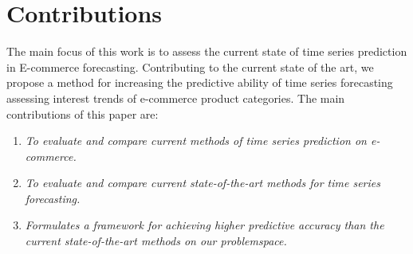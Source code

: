 \section{Contributions}
\label{sections:Introduction:Contributions}

The main focus of this work is to assess the current state of time series prediction in E-commerce forecasting.
Contributing to the current state of the art,
we propose a method for increasing the predictive ability of time series forecasting
assessing interest trends of e-commerce product categories.
The main contributions of this paper are:

\begin{enumerate}
    \item {\it To evaluate and compare current methods of time series prediction on e-commerce.}
    \item {\it To evaluate and compare current state-of-the-art methods for time series forecasting.}
    \item {\it Formulates a framework for achieving higher predictive accuracy than the current state-of-the-art methods on our problemspace.}
\end{enumerate}


\iffalse
The main description of the contributions will come in chapter~\ref{cont} after the results are presented. This section just provides a brief summary of the main contributions of the work. This section can also be left out, leaving all discussions in chapter~\ref{cont}.

The format of this section will generally follow the following format:
{\it
Donec non turpis nec neque egestas faucibus nec id neque. Etiam consectetur, odio vitae gravida tempus, diam velit sagittis turpis, a molestie ligula tellus at nunc. Nam convallis consequat vestibulum. Proin dolor neque, dapibus a pellentesque a, commodo a nibh.}

\begin{enumerate}
\item {\it Lorem ipsum dolor sit amet, consectetur adipiscing elit.}
\item {\it Lorem ipsum dolor sit amet, consectetur adipiscing elit.}
\item {\it Lorem ipsum dolor sit amet, consectetur adipiscing elit.}
\end{enumerate}
\fi
